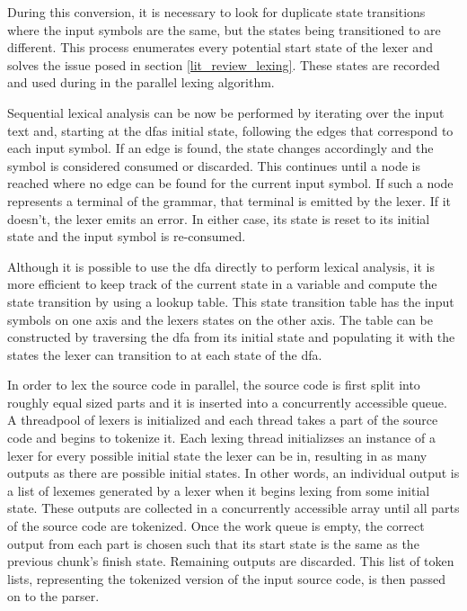 During this conversion, it is necessary to look for duplicate state transitions
where the input symbols are the same, but the states being transitioned to are
different. This process enumerates every potential start state of the lexer
and solves the issue posed in section \ref{lit_review_lexing}. These states
are recorded and used during in the parallel lexing algorithm. 

Sequential lexical analysis can be now be performed by iterating over the
input text and, starting at the \glspl{dfa} initial state, following the edges
that correspond to each input symbol. If an edge is found, the state changes
accordingly and the symbol is considered consumed or discarded. This continues
until a node is reached where no edge can be found for the current input symbol.
If such a node represents a terminal of the grammar, that terminal is emitted by
the lexer.  If it doesn't, the lexer emits an error. In either case, its state
is reset to its initial state and the input symbol is re-consumed.


Although it is possible to use the \gls{dfa} directly to perform lexical
analysis, it is more efficient to keep track of the current state in a variable
and compute the state transition by using a lookup table. This state transition
table has the input symbols on one axis and the lexers states on the other axis.
The table can be constructed by traversing the \gls{dfa} from its initial state
and populating it with the states the lexer can transition to at each state of
the \gls{dfa}.

In order to lex the source code in parallel, the source code is first split
into roughly equal sized parts and it is inserted into a concurrently accessible
queue. A threadpool of lexers is initialized and each thread takes a part of
the source code and begins to tokenize it. Each lexing thread initializses
an instance of a lexer for every possible initial state the lexer can be in,
resulting in as many outputs as there are possible initial states. In other
words, an individual output is a list of lexemes generated by a lexer when
it begins lexing from some initial state. These outputs are collected in a
concurrently accessible array until all parts of the source code are tokenized.
Once the work queue is empty, the correct output from each part is chosen such
that its start state is the same as the previous chunk's finish state. Remaining
outputs are discarded. This list of token lists, representing the tokenized
version of the input source code, is then passed on to the parser. 

